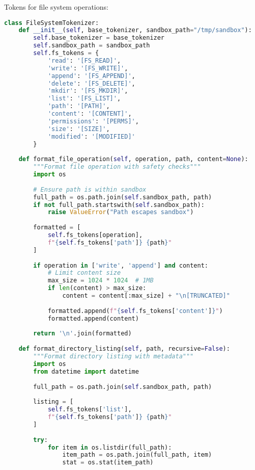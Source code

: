 Tokens for file system operations:

\begin{lstlisting}[language=Python, caption=File system operation tokens]
class FileSystemTokenizer:
    def __init__(self, base_tokenizer, sandbox_path="/tmp/sandbox"):
        self.base_tokenizer = base_tokenizer
        self.sandbox_path = sandbox_path
        self.fs_tokens = {
            'read': '[FS_READ]',
            'write': '[FS_WRITE]',
            'append': '[FS_APPEND]',
            'delete': '[FS_DELETE]',
            'mkdir': '[FS_MKDIR]',
            'list': '[FS_LIST]',
            'path': '[PATH]',
            'content': '[CONTENT]',
            'permissions': '[PERMS]',
            'size': '[SIZE]',
            'modified': '[MODIFIED]'
        }
        
    def format_file_operation(self, operation, path, content=None):
        """Format file operation with safety checks"""
        import os
        
        # Ensure path is within sandbox
        full_path = os.path.join(self.sandbox_path, path)
        if not full_path.startswith(self.sandbox_path):
            raise ValueError("Path escapes sandbox")
        
        formatted = [
            self.fs_tokens[operation],
            f"{self.fs_tokens['path']} {path}"
        ]
        
        if operation in ['write', 'append'] and content:
            # Limit content size
            max_size = 1024 * 1024  # 1MB
            if len(content) > max_size:
                content = content[:max_size] + "\n[TRUNCATED]"
            
            formatted.append(f"{self.fs_tokens['content']}")
            formatted.append(content)
        
        return '\n'.join(formatted)
    
    def format_directory_listing(self, path, recursive=False):
        """Format directory listing with metadata"""
        import os
        from datetime import datetime
        
        full_path = os.path.join(self.sandbox_path, path)
        
        listing = [
            self.fs_tokens['list'],
            f"{self.fs_tokens['path']} {path}"
        ]
        
        try:
            for item in os.listdir(full_path):
                item_path = os.path.join(full_path, item)
                stat = os.stat(item_path)
                

\end{lstlisting}
